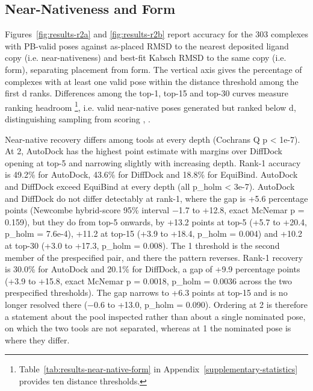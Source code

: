 \hypertarget{near-nativeness-and-form}{%
\subsection{Near-Nativeness and Form}\label{near-nativeness-and-form}}

Figures~\ref{fig:results-r2a} and \ref{fig:results-r2b} report accuracy for the 303 complexes with PB-valid poses against as-placed RMSD to the nearest deposited ligand copy (i.e. near-nativeness) and best-fit Kabsch RMSD to the same copy (i.e. form), separating placement from form. The vertical axis gives the percentage of complexes with at least one valid pose within the distance threshold among the first d ranks. Differences among the top-1, top-15 and top-30 curves measure ranking headroom \footnote{Table~\ref{tab:results-near-native-form} in Appendix~\ref{supplementary-statistics} provides ten distance thresholds.}, i.e. valid near-native poses generated but ranked below d, distinguishing sampling from scoring \cite{ref050}, \cite{ref052}. 

Near-native recovery differs among tools at every depth (Cochran\textquotesingle s Q p \textless{} 1e-7). At 2\angstrom{}, AutoDock has the highest point estimate with margins over DiffDock opening at top-5 and narrowing slightly with increasing depth. Rank-1 accuracy is 49.2\% for AutoDock, 43.6\% for DiffDock and 18.8\% for EquiBind. AutoDock and DiffDock exceed EquiBind at every depth (all p\_holm \textless{} 3e-7). AutoDock and DiffDock do not differ detectably at rank-1, where the gap is +5.6 percentage points (Newcombe hybrid-score 95\% interval \ensuremath{-}1.7 to +12.8, exact McNemar p = 0.159), but they do from top-5 onwards, by +13.2 points at top-5 (+5.7 to +20.4, p\_holm = 7.6e-4), +11.2 at top-15 (+3.9 to +18.4, p\_holm = 0.004) and +10.2 at top-30 (+3.0 to +17.3, p\_holm = 0.008). The 1\angstrom{} threshold is the second member of the prespecified pair, and there the pattern reverses. Rank-1 recovery is 30.0\% for AutoDock and 20.1\% for DiffDock, a gap of +9.9 percentage points (+3.9 to +15.8, exact McNemar p = 0.0018, p\_holm = 0.0036 across the two prespecified thresholds). The gap narrows to +6.3 points at top-15 and is no longer resolved there (\ensuremath{-}0.6 to +13.0, p\_holm = 0.090). Ordering at 2\angstrom{} is therefore a statement about the pool inspected rather than about a single nominated pose, on which the two tools are not separated, whereas at 1\angstrom{} the nominated pose is where they differ.

